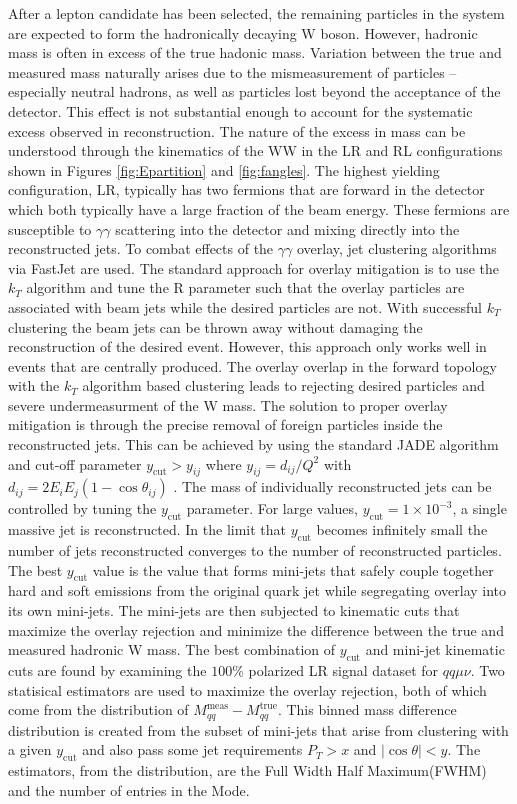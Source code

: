 After a lepton candidate has been selected, the remaining particles in the system are expected to form the hadronically decaying W boson. However, hadronic mass is often in excess of the true hadonic mass. Variation between the true and measured mass naturally arises due to the mismeasurement of particles -- especially neutral hadrons, as well as particles lost beyond the acceptance of the detector. This effect is not substantial enough to account for the systematic excess observed in reconstruction. The nature of the excess in mass can be understood through the kinematics of the WW in the LR and RL configurations shown in Figures \ref{fig:Epartition} and \ref{fig:fangles}. The highest yielding configuration, LR, typically has two fermions that are forward in the detector which both typically have a large fraction of the beam energy. These fermions are susceptible to $\gamma\gamma$ scattering into the detector and mixing directly into the reconstructed jets. To combat effects of the $\gamma \gamma$ overlay, jet clustering algorithms via FastJet\cite{fastjet} are used.  The standard approach for overlay mitigation is to use the $k_T$ algorithm\cite{kt} and tune the R parameter such that the overlay particles are associated with beam jets while the desired particles are not. With successful $k_T$ clustering the beam jets can be thrown away without damaging the reconstruction of the desired event. However, this approach only works well in events that are centrally produced.  The overlay overlap in the forward topology with the $k_T$ algorithm  based clustering leads to rejecting desired particles and severe undermeasurment of the W mass. The solution to proper overlay mitigation is through the precise removal of foreign particles inside the reconstructed jets.  This can be achieved by using the standard JADE algorithm and cut-off parameter $y_{\text{cut}} > y_{ij}$ where $y_{ij} = d_{ij} / Q^2$ with $d_{ij} = 2E_i E_j(1-\cos\theta_{ij})$ \cite{fastjet}.  The mass of individually reconstructed jets can be controlled by tuning the $y_{\text{cut}}$ parameter. For large values, $y_{\text{cut}} =1\times10^{-3}$, a single massive jet is reconstructed. In the limit that $y_{\text{cut}}$ becomes infinitely small the number of jets reconstructed converges to the number of reconstructed particles.  The best $y_{\text{cut}}$ value is the value that forms mini-jets that safely couple together hard and soft emissions from  the original quark jet while segregating overlay into its own mini-jets. The mini-jets are then subjected to kinematic cuts that maximize the overlay rejection and minimize the difference  between the true and measured hadronic W mass. 	The best combination of $y_{\text{cut}}$ and mini-jet kinematic cuts are found by examining the $100\%$ polarized LR signal dataset for $qq \mu \nu$.  Two statisical estimators are used to maximize the overlay rejection, both of which come from the distribution of $M_{qq}^{\text{meas}} - M_{qq}^{\text{true}}$. This binned mass difference distribution is created from the subset of mini-jets that arise from clustering with a given $y_{\text{cut}}$ and also pass some jet requirements $P_{T} > x$ and $|\cos\theta| < y$. The estimators, from the distribution, are the Full Width Half Maximum(FWHM) and the number of entries in the Mode.  
